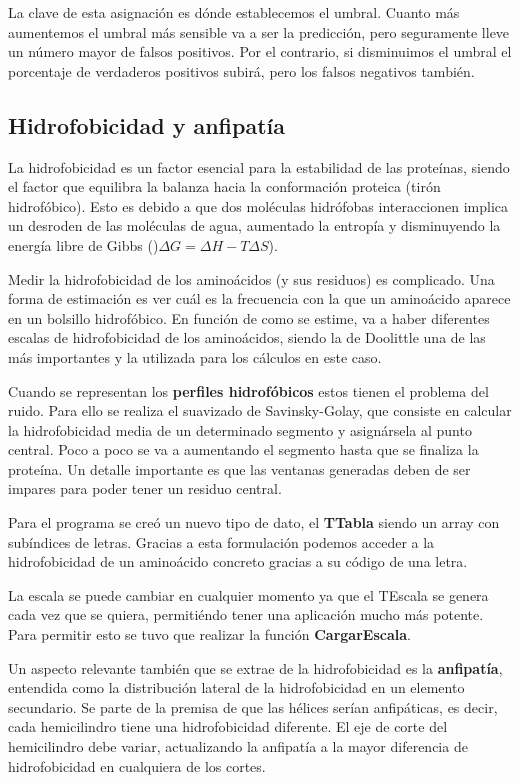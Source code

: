 \documentclass[a4paper,11pt]{report}
\begin{document}
La clave de esta asignación es dónde establecemos el umbral. Cuanto más aumentemos el umbral más sensible va a ser la predicción, pero seguramente lleve un número mayor de falsos positivos. Por el contrario, si disminuimos el umbral el porcentaje de verdaderos positivos subirá, pero los falsos negativos también.



 \subsection{Hidrofobicidad y anfipatía}
 La hidrofobicidad es un factor esencial para la estabilidad de las proteínas, siendo el factor que equilibra la balanza hacia la conformación proteica (tirón hidrofóbico). Esto es debido a que dos moléculas  hidrófobas interaccionen implica un desroden de las moléculas de agua, aumentado la entropía y disminuyendo la energía libre de Gibbs ()$\Delta G = \Delta H- T \Delta S $).
 
 Medir la hidrofobicidad de los aminoácidos (y sus residuos) es complicado. Una forma de estimación es ver cuál es la frecuencia con la que un aminoácido aparece en un bolsillo hidrofóbico. En función de como se estime, va a haber diferentes escalas de hidrofobicidad de los aminoácidos, siendo la de Doolittle una de las más importantes y la utilizada para los cálculos en este caso.
 
 Cuando se representan los \textbf{perfiles hidrofóbicos} estos tienen el problema del ruido. Para ello se realiza el suavizado de Savinsky-Golay, que consiste en calcular la hidrofobicidad media de un determinado segmento y asignársela al punto central. Poco a poco se va a aumentando el segmento hasta que se finaliza la proteína. Un detalle importante es que las ventanas generadas deben de ser impares para poder tener un residuo central.
 
 Para el programa se creó un nuevo tipo de dato, el \textbf{TTabla} siendo un array con subíndices de letras. Gracias a esta formulación podemos acceder a la hidrofobicidad de un aminoácido concreto gracias a su código de una letra. 
  
 La escala se puede cambiar en cualquier momento ya que el TEscala se genera cada vez que se quiera, permitiéndo tener una aplicación mucho más potente.  Para permitir esto se tuvo que realizar la función \textbf{CargarEscala}.
 
 Un aspecto relevante también que se extrae de la hidrofobicidad es la \textbf{anfipatía}, entendida como la distribución lateral de la hidrofobicidad en un elemento secundario. Se parte de la premisa de que las hélices serían anfipáticas, es decir, cada hemicilindro tiene una hidrofobicidad diferente. El eje de corte del hemicilindro debe variar, actualizando la anfipatía a la mayor diferencia de hidrofobicidad en cualquiera de los cortes.
 
\end{document}
